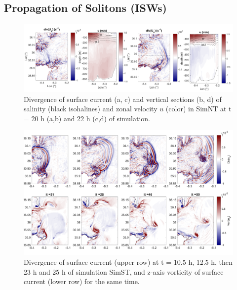 \subsection{Propagation of Solitons (ISWs)}

\begin{figure}[!h]
 \centering
 \includegraphics[width=1.\textwidth]{./GBR3D/coupesISW_ME2-2.png}
 \caption {Divergence of surface current (a, c) and vertical sections (b, d) of salinity (black isohalines) and zonal velocity $u$ (color) in SimNT at t = 20 h (a,b) and 22 h (c,d) of simulation.}
  \label{FigISWNT}
\end{figure}

\begin{figure}[!h]
 \centering
\includegraphics[width=\linewidth]{./GBR3D/FigTourbVE2.png}
 \caption {Divergence of surface current (upper row) at t = 10.5 h, 12.5 h, then 23 h and 25 h of simulation SimST, and z-axis vorticity of surface current (lower row) for the same time.}
 \label{FigeddGBR3D}
\end{figure}

